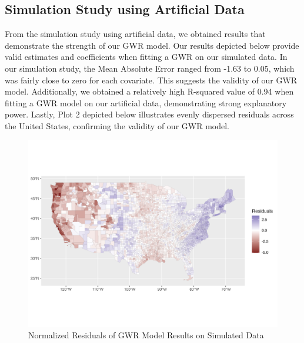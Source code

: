 \documentclass[
]{article}
\begin{document}
\subsection{Simulation Study using Artificial
Data}\label{simulation-study-using-artificial-data}

From the simulation study using artificial data, we obtained results
that demonstrate the strength of our GWR model. Our results depicted
below provide valid estimates and coefficients when fitting a GWR on our
simulated data. In our simulation study, the Mean Absolute Error ranged
from -1.63 to 0.05, which was fairly close to zero for each covariate.
This suggests the validity of our GWR model. Additionally, we obtained a
relatively high R-squared value of 0.94 when fitting a GWR model on our
artificial data, demonstrating strong explanatory power. Lastly, Plot 2
depicted below illustrates evenly dispersed residuals across the United
States, confirming the validity of our GWR model.

\begin{figure}[H]

{\centering \includegraphics{sim_residual_plot.png}

}

\caption{Normalized Residuals of GWR Model Results on Simulated Data}

\end{figure}%
\end{document}
